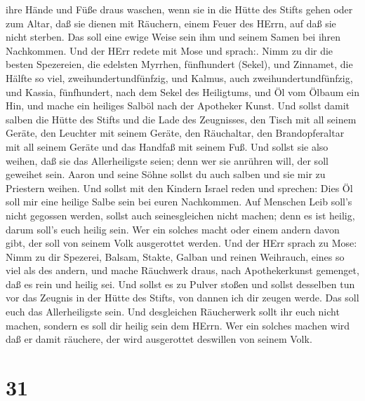 ihre Hände und Füße draus waschen,  wenn sie in die Hütte
des Stifts gehen oder zum Altar, daß sie dienen mit Räuchern, einem
Feuer des HErrn,  auf daß sie nicht sterben. Das soll eine
ewige Weise sein ihm und seinem Samen bei ihren Nachkommen.
 Und der HErr redete mit Mose und sprach:. 
Nimm zu dir die besten Spezereien, die edelsten Myrrhen, fünfhundert
(Sekel), und Zinnamet, die Hälfte so viel, zweihundertundfünfzig, und
Kalmus, auch zweihundertundfünfzig,  und Kassia,
fünfhundert, nach dem Sekel des Heiligtums, und Öl vom Ölbaum ein Hin,
 und mache ein heiliges Salböl nach der Apotheker Kunst.
 Und sollst damit salben die Hütte des Stifts und die Lade
des Zeugnisses,  den Tisch mit all seinem Geräte, den
Leuchter mit seinem Geräte, den Räuchaltar,  den
Brandopferaltar mit all seinem Geräte und das Handfaß mit seinem Fuß.
 Und sollst sie also weihen, daß sie das Allerheiligste
seien; denn wer sie anrühren will, der soll geweihet sein. 
Aaron und seine Söhne sollst du auch salben und sie mir zu Priestern
weihen.  Und sollst mit den Kindern Israel reden und
sprechen: Dies Öl soll mir eine heilige Salbe sein bei euren Nachkommen.
 Auf Menschen Leib soll's nicht gegossen werden, sollst
auch seinesgleichen nicht machen; denn es ist heilig, darum soll's euch
heilig sein.  Wer ein solches macht oder einem andern davon
gibt, der soll von seinem Volk ausgerottet werden.  Und der
HErr sprach zu Mose: Nimm zu dir Spezerei, Balsam, Stakte, Galban und
reinen Weihrauch, eines so viel als des andern,  und mache
Räuchwerk draus, nach Apothekerkunst gemenget, daß es rein und heilig
sei.  Und sollst es zu Pulver stoßen und sollst desselben
tun vor das Zeugnis in der Hütte des Stifts, von dannen ich dir zeugen
werde. Das soll euch das Allerheiligste sein.  Und
desgleichen Räucherwerk sollt ihr euch nicht machen, sondern es soll dir
heilig sein dem HErrn.  Wer ein solches machen wird daß er
damit räuchere, der wird ausgerottet deswillen von seinem Volk.

\hypertarget{section-30}{%
\section{31}\label{section-30}}

